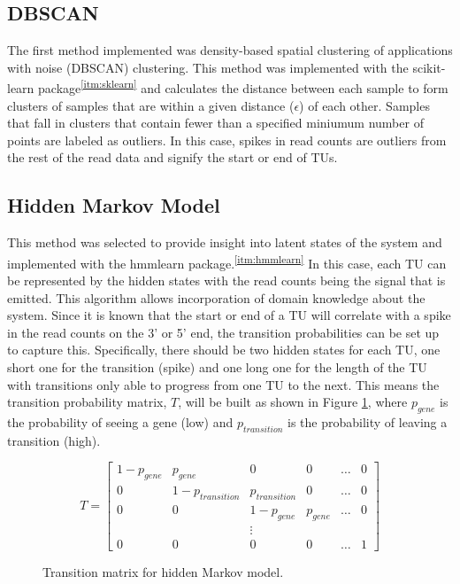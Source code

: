 \documentclass{article}
\newcommand{\cited}[1]{\textsuperscript{\ref{itm:#1}}}
\begin{document}
\subsection*{DBSCAN}
The first method implemented was density-based spatial clustering of applications with noise (DBSCAN) clustering.  This method was implemented with the scikit-learn package\cited{sklearn} and calculates the distance between each sample to form clusters of samples that are within a given distance ($\epsilon$) of each other.  Samples that fall in clusters that contain fewer than a specified miniumum number of points are labeled as outliers.  In this case, spikes in read counts are outliers from the rest of the read data and signify the start or end of TUs.

\subsection*{Hidden Markov Model}
This method was selected to provide insight into latent states of the system and implemented with the hmmlearn package.\cited{hmmlearn}  In this case, each TU can be represented by the hidden states with the read counts being the signal that is emitted.  This algorithm allows incorporation of domain knowledge about the system.  Since it is known that the start or end of a TU will correlate with a spike in the read counts on the 3' or 5' end, the transition probabilities can be set up to capture this.  Specifically, there should be two hidden states for each TU, one short one for the transition (spike) and one long one for the length of the TU with transitions only able to progress from one TU to the next.  This means the transition probability matrix, $T$, will be built as shown in Figure \ref{fig:tmat}, where $p_{gene}$ is the probability of seeing a gene (low) and $p_{transition}$ is the probability of leaving a transition (high).
\begin{figure}[H]
    \centering
    \[T = \begin{bmatrix}
    1-p_{gene} & p_{gene} & 0 & 0 & \dots & 0 \\
    0 & 1-p_{transition} & p_{transition} & 0 & \dots & 0 \\
    0 & 0 & 1-p_{gene} & p_{gene} & \dots & 0 \\
    && \vdots \\
    0 & 0 & 0 & 0 & \dots & 1
    \end{bmatrix}\]
    \caption{Transition matrix for hidden Markov model.}
    \label{fig:tmat}
\end{figure}
\end{document}
